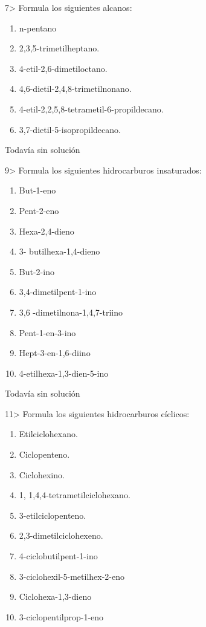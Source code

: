 \documentclass{article}
\begin{document}
\begin{exercise}
  7> Formula los siguientes alcanos:
  \begin{enumerate}
    \item n-pentano
    \item 2,3,5-trimetilheptano.
    \item 4-etil-2,6-dimetiloctano.
    \item 4,6-dietil-2,4,8-trimetilnonano.
    \item 4-etil-2,2,5,8-tetrametil-6-propildecano.
    \item 3,7-dietil-5-isopropildecano.
  \end{enumerate}
\end{exercise}

\begin{solution}[print=false]
  Todavía sin solución
\end{solution}

\begin{exercise}
  9> Formula los siguientes hidrocarburos insaturados:
  \begin{enumerate}
    \item But-1-eno
    \item Pent-2-eno
    \item Hexa-2,4-dieno
    \item 3- butilhexa-1,4-dieno
    \item But-2-ino
    \item 3,4-dimetilpent-1-ino
    \item 3,6 -dimetilnona-1,4,7-triino
    \item Pent-1-en-3-ino
    \item Hept-3-en-1,6-diino
    \item 4-etilhexa-1,3-dien-5-ino
  \end{enumerate}
\end{exercise}

\begin{solution}[print=false]
  Todavía sin solución
\end{solution}

\begin{exercise}
  11> Formula los siguientes hidrocarburos cíclicos:
  \begin{enumerate}
    \item Etilciclohexano.
    \item Ciclopenteno.
    \item Ciclohexino.
    \item 1, 1,4,4-tetrametilciclohexano.
    \item 3-etilciclopenteno.
    \item 2,3-dimetilciclohexeno.
    \item 4-ciclobutilpent-1-ino
    \item 3-ciclohexil-5-metilhex-2-eno
    \item Ciclohexa-1,3-dieno
    \item 3-ciclopentilprop-1-eno
  \end{enumerate}
\end{exercise}
\end{document}
